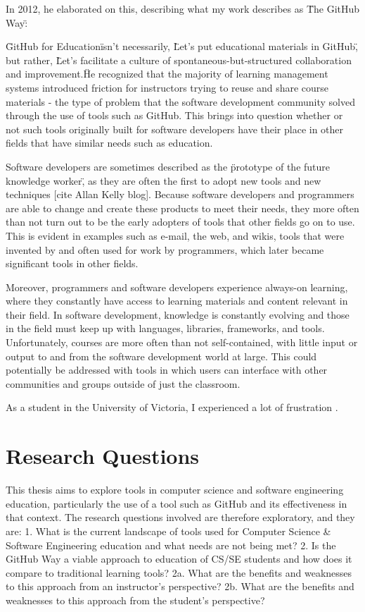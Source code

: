 In 2012, he elaborated on this, describing what my work describes as \"The GitHub Way\":

\"GitHub for Education\" isn’t necessarily, \"Let’s put educational materials in GitHub\", but rather, \"Let’s facilitate a culture of spontaneous-but-structured collaboration and improvement.\"

He recognized that the majority of learning management systems introduced friction for instructors trying to reuse and share course materials - the type of problem that the software development community solved through the use of tools such as GitHub. This brings into question whether or not such tools originally built for software developers have their place in other fields that have similar needs such as education.

Software developers are sometimes described as the \"prototype of the future knowledge worker\", as they are often the first to adopt new tools and new techniques [cite Allan Kelly blog]. Because software developers and programmers are able to change and create these products to meet their needs, they more often than not turn out to be the early adopters of tools that other fields go on to use. This is evident in examples such as e-mail, the web, and wikis, tools that were invented by and often used for work by programmers, which later became significant tools in other fields.


Moreover, programmers and software developers experience always-on learning, where they constantly have access to learning materials and content relevant in their field. In software development, knowledge is constantly evolving and those in the field must keep up with languages, libraries, frameworks, and tools. Unfortunately, courses are more often than not self-contained, with little input or output to and from the software development world at large. This could potentially be addressed with tools in which users can interface with other communities and groups outside of just the classroom.

As a student in the University of Victoria, I experienced a lot of frustration .

\section{Research Questions}
This thesis aims to explore tools in computer science and software engineering education, particularly the use of a tool such as GitHub and its effectiveness in that context. The research questions involved are therefore exploratory, and they are:
1. What is the current landscape of tools used for Computer Science \& Software Engineering education and what needs are not being met?
2. Is the GitHub Way a viable approach to education of CS/SE students and how does it compare to traditional learning tools?
2a. What are the benefits and weaknesses to this approach from an instructor's perspective?
2b. What are the benefits and weaknesses to this approach from the student's perspective?

